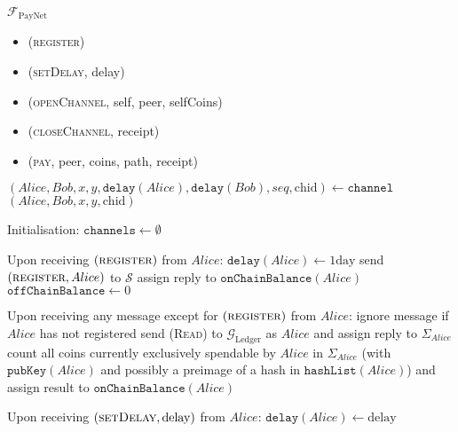 \begin{functionality}{$\mathcal{F}_{\mathrm{PayNet}}$}
  \label{alg:payfunc}
    \begin{itemize}
      \item (\textsc{register})
      \item (\textsc{setDelay}, delay)
      \item (\textsc{openChannel}, self, peer, selfCoins)
      \item (\textsc{closeChannel}, receipt)
      \item (\textsc{pay}, peer, coins, path, receipt)
    \end{itemize}

  \begin{algorithmic}[1]
      \State $\left(Alice, Bob, x, y, \mathtt{delay}\left(Alice\right),
      \mathtt{delay}\left(Bob\right), seq, \mathrm{chid}\right) \gets
      \mathtt{channel}$
      \State \Return $\left(Alice, Bob, x, y, \mathrm{chid}\right)$
    \EndFunction
    \State

    \State Initialisation:
    \Indent
      \State $\mathtt{channels} \gets \emptyset$
    \EndIndent
    \State

    \State Upon receiving $\left(\textsc{register}\right)$ from $Alice$:
    \Indent
      \State $\mathtt{delay}\left(Alice\right) \gets 1\mathrm{day}$
      \State send $\left(\textsc{register}, Alice\right)$ to $\mathcal{S}$
      \State assign reply to $\mathtt{onChainBalance}\left(Alice\right)$
      \State $\mathtt{offChainBalance} \gets 0$
    \EndIndent
    \State

    \State Upon receiving any message except for
    $\left(\textsc{register}\right)$ from $Alice$:
    \Indent
      \State ignore message if $Alice$ has not registered
      \State send (\textsc{Read}) to $\mathcal{G}_{\mathrm{Ledger}}$ as $Alice$
      and assign reply to $\Sigma_{Alice}$
      \State count all coins currently exclusively spendable by $Alice$ in
      $\Sigma_{Alice}$ (with $\mathtt{pubKey}\left(Alice\right)$ and possibly a
      preimage of a hash in $\mathtt{hashList}\left(Alice\right)$) and assign
      result to $\mathtt{onChainBalance}\left(Alice\right)$ 
    \EndIndent
    \State

    \State Upon receiving $\left(\textsc{setDelay}, \mathrm{delay}\right)$
    from $Alice$: 
    \Indent
      \State $\mathtt{delay}\left(Alice\right) \gets \mathrm{delay}$
    \EndIndent
    \State


\end{algorithmic}
\end{functionality}
